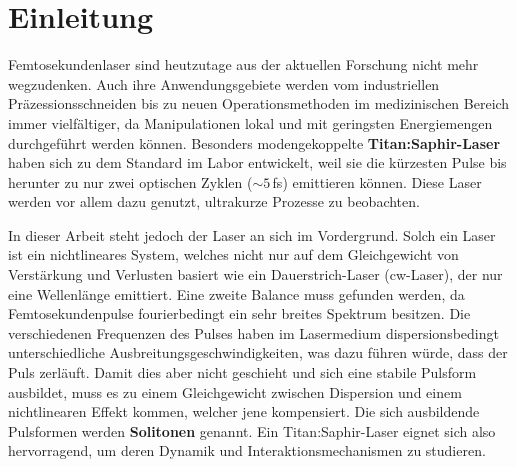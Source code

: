 \documentclass[bachelor,       %
               twoside,        %
               BCOR10mm,       %
               liststotoc,nomtotoc,bibtotoc, %
               english,ngerman, %
               final,          %
               ]{GAUBM}
\begin{document}
\mainmatter   %

\chapter{Einleitung}
Femtosekundenlaser sind heutzutage aus der aktuellen Forschung nicht mehr wegzudenken.
Auch ihre Anwendungsgebiete werden vom industriellen Präzessionsschneiden bis zu neuen Operationsmethoden im medizinischen Bereich immer vielfältiger, da Manipulationen lokal und mit geringsten Energiemengen durchgeführt werden können.
Besonders modengekoppelte \textbf{Titan:Saphir-Laser} haben sich zu dem Standard im Labor entwickelt, weil sie die kürzesten Pulse bis herunter zu nur zwei optischen Zyklen ($\sim 5\,$fs) emittieren können.
Diese Laser werden vor allem dazu genutzt, ultrakurze Prozesse zu beobachten.

In dieser Arbeit steht jedoch der Laser an sich im Vordergrund.
Solch ein Laser ist ein nichtlineares System, welches nicht nur auf dem Gleichgewicht von Verstärkung und Verlusten basiert wie ein Dauerstrich-Laser (cw-Laser), der nur eine Wellenlänge emittiert.
Eine zweite Balance muss gefunden werden, da Femtosekundenpulse fourierbedingt ein sehr breites Spektrum besitzen.
Die verschiedenen Frequenzen des Pulses haben im Lasermedium dispersionsbedingt unterschiedliche Ausbreitungsgeschwindigkeiten, was dazu führen würde, dass der Puls zerläuft.
Damit dies aber nicht geschieht und sich eine stabile Pulsform ausbildet, muss es zu  einem Gleichgewicht zwischen Dispersion und einem nichtlinearen Effekt kommen, welcher jene kompensiert.
Die sich ausbildende Pulsformen werden \textbf{Solitonen} genannt.
Ein Titan:Saphir-Laser eignet sich also hervorragend, um deren Dynamik und Interaktionsmechanismen zu studieren.
\end{document}
